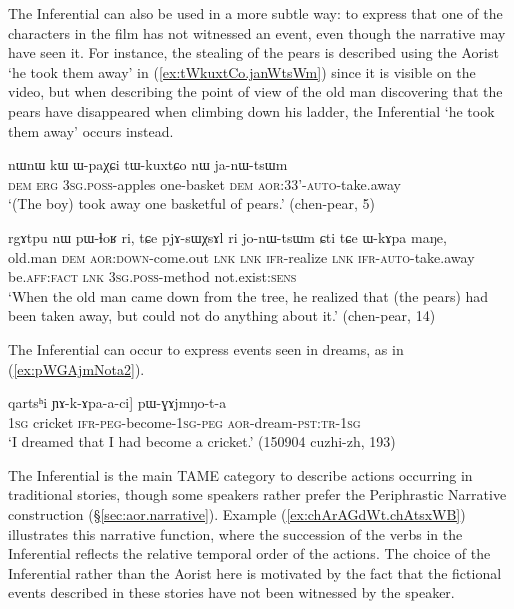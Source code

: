 The Inferential can also be used in a more subtle way: to express that one of the characters in the film has not witnessed an event, even though the narrative may have seen it. For instance, the stealing of the pears is described using the Aorist  `he took them away' in (\ref{ex:tWkuxtCo.janWtsWm}) since it is visible on the video, but when describing the point of view of the old man discovering that the pears have disappeared when climbing down his ladder, the Inferential  `he took them away' occurs instead.

\begin{exe}
\ex \label{ex:tWkuxtCo.janWtsWm}
\gll nɯnɯ kɯ ɯ-paχɕi tɯ-kuxtɕo nɯ ja-nɯ-tsɯm \\
\textsc{dem} \textsc{erg} \textsc{3sg}.\textsc{poss}-apples one-basket \textsc{dem} \textsc{aor}:3\fl{}3'-\textsc{auto}-take.away \\
\glt `(The boy) took away one basketful of pears.' (chen-pear, 5)
 \end{exe}
 
\begin{exe}
\ex \label{ex:jonWtsWm.Cti}
\gll rgɤtpu nɯ pɯ-ɬoʁ ri, tɕe pjɤ-sɯχsɤl ri jo-nɯ-tsɯm ɕti tɕe ɯ-kɤpa maŋe,  \\
old.man \textsc{dem} \textsc{aor}:\textsc{down}-come.out \textsc{lnk} \textsc{lnk} \textsc{ifr}-realize \textsc{lnk} \textsc{ifr}-\textsc{auto}-take.away be.\textsc{aff}:\textsc{fact} \textsc{lnk} \textsc{3sg}.\textsc{poss}-method not.exist:\textsc{sens} \\
\glt `When the old man came down from the tree, he realized that (the pears) had been taken away, but could not do anything about it.' (chen-pear, 14)
 \end{exe}

The Inferential can occur to express events seen in dreams, as in (\ref{ex:pWGAjmNota2}).

\begin{exe}
\ex \label{ex:pWGAjmNota2}
 \gll [aʑo [...] qartsʰi ɲɤ-k-ɤpa-a-ci] pɯ-ɣɤjmŋo-t-a \\
\textsc{1sg} {  } cricket \textsc{ifr}-\textsc{peg}-become-\textsc{1sg}-\textsc{peg} \textsc{aor}-dream-\textsc{pst}:\textsc{tr}-\textsc{1sg} \\
\glt `I dreamed that I had become a cricket.' (150904 cuzhi-zh, 193)
\end{exe}

The Inferential is the main TAME category to describe actions occurring in traditional stories, though some speakers rather prefer the Periphrastic Narrative construction (§\ref{sec:aor.narrative}). Example (\ref{ex:chArAGdWt.chAtsxWB}) illustrates this narrative function, where the succession of the verbs in the Inferential reflects the relative temporal order of the actions. The choice of the Inferential rather than the Aorist here is motivated by the fact that the fictional events described in these stories have not been witnessed by the speaker. 


